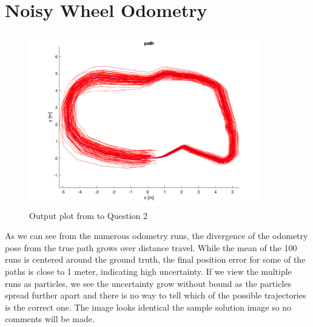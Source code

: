 \documentclass{article} %
\begin{document}
\section{Noisy Wheel Odometry} %
\begin{figure}[hbt]
  \centering
    \includegraphics[width=0.9\textwidth]{ass1_q2.png}
  \caption{Output plot from to Question 2}
\end{figure}

As we can see from the numerous odometry runs, the divergence of the odometry pose from the true path grows over distance travel. While the mean of the 100 runs is centered around the ground truth, the final position error for some of the paths is close to 1 meter, indicating high uncertainty.
If we view the multiple runs as particles, we see the uncertainty grow without bound as the particles spread further apart and there is no way to tell which of the possible trajectories is the correct one.
The image looks identical the sample solution image so no comments will be made.

\end{document}
